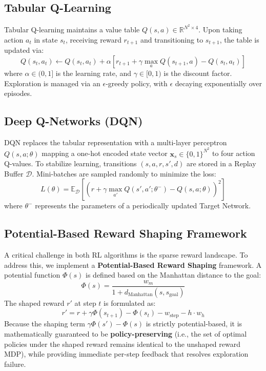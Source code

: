 \documentclass[conference]{IEEEtran}
\begin{document}
\subsection{Tabular Q-Learning}
Tabular Q-learning maintains a value table $Q(s,a) \in \mathbb{R}^{N^2 \times 4}$. Upon taking action $a_t$ in state $s_t$, receiving reward $r_{t+1}$ and transitioning to $s_{t+1}$, the table is updated via:
\begin{equation}
Q(s_t,a_t) \leftarrow Q(s_t,a_t) + \alpha \left[ r_{t+1} + \gamma \max_{a} Q(s_{t+1},a) - Q(s_t,a_t) \right]
\end{equation}
where $\alpha \in (0,1]$ is the learning rate, and $\gamma \in [0,1)$ is the discount factor. Exploration is managed via an $\epsilon$-greedy policy, with $\epsilon$ decaying exponentially over episodes.

\subsection{Deep Q-Networks (DQN)}
DQN replaces the tabular representation with a multi-layer perceptron $Q(s,a; \theta)$ mapping a one-hot encoded state vector $\mathbf{x}_s \in \{0,1\}^{N^2}$ to four action Q-values. To stabilize learning, transitions $(s,a,r,s',d)$ are stored in a Replay Buffer $\mathcal{D}$. Mini-batches are sampled randomly to minimize the loss:
\begin{equation}
L(\theta) = \mathbb{E}_{\mathcal{D}} \left[ \left( r + \gamma \max_{a'} Q(s',a'; \theta^-) - Q(s,a; \theta) \right)^2 \right]
\end{equation}
where $\theta^-$ represents the parameters of a periodically updated Target Network.

\subsection{Potential-Based Reward Shaping Framework}
A critical challenge in both RL algorithms is the sparse reward landscape. To address this, we implement a \textbf{Potential-Based Reward Shaping} framework. A potential function $\Phi(s)$ is defined based on the Manhattan distance to the goal:
\begin{equation}
\Phi(s) = \frac{w_m}{1 + d_{\text{Manhattan}}(s, s_{\text{goal}})}
\end{equation}
The shaped reward $r'$ at step $t$ is formulated as:
\begin{equation}
r' = r + \gamma \Phi(s_{t+1}) - \Phi(s_t) - w_{\text{step}} - h \cdot w_h
\end{equation}
Because the shaping term $\gamma \Phi(s') - \Phi(s)$ is strictly potential-based, it is mathematically guaranteed to be \textbf{policy-preserving} (i.e., the set of optimal policies under the shaped reward remains identical to the unshaped reward MDP), while providing immediate per-step feedback that resolves exploration failure.
\end{document}
